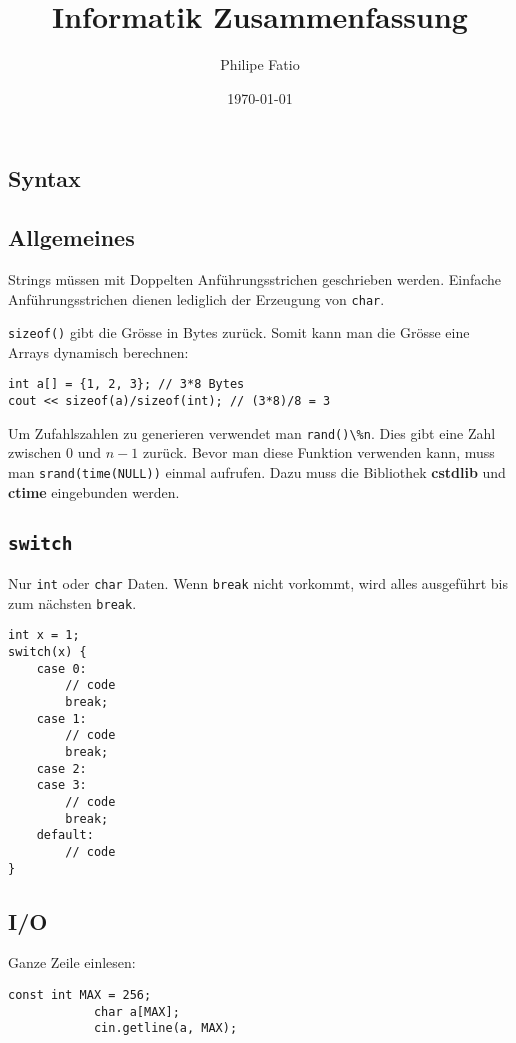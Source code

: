 \documentclass{article}
\author{Philipe Fatio}
\title{Informatik Zusammenfassung}
\date{\today}
\newenvironment{code}
	{\begin{shaded}\vspace{-2.2mm}} 
	{\vspace{-5.0mm}\end{shaded}}
\begin{document}
\begin{multicols*}{3}

	\section{Syntax} %
		\subsection{Allgemeines} %
			Strings müssen mit Doppelten Anführungsstrichen geschrieben werden. Einfache Anführungsstrichen dienen lediglich der Erzeugung von \lstinline!char!.
			
			\lstinline!sizeof()! gibt die Grösse in Bytes zurück. Somit kann man die Grösse eine Arrays dynamisch berechnen:
			\begin{code}
				\begin{lstlisting}[style=list]
int a[] = {1, 2, 3}; // 3*8 Bytes
cout << sizeof(a)/sizeof(int); // (3*8)/8 = 3
				\end{lstlisting}
			\end{code}
			
			Um Zufahlszahlen zu generieren verwendet man \lstinline!rand()\%n!. Dies gibt eine Zahl zwischen 0 und $n-1$ zurück. Bevor man diese Funktion verwenden kann, muss man \lstinline!srand(time(NULL))! einmal aufrufen. Dazu muss die Bibliothek \textbf{cstdlib} und \textbf{ctime} eingebunden werden.
		\subsection{\lstinline!switch!} %
			Nur \lstinline!int! oder \lstinline!char! Daten. Wenn \lstinline!break! nicht vorkommt, wird alles ausgeführt bis zum nächsten \lstinline!break!.
			
			\begin{code}
				\begin{lstlisting}[style=list]
int x = 1;
switch(x) {
	case 0:
		// code
		break;
	case 1:
		// code
		break;
	case 2:
	case 3:
		// code
		break;
	default:
		// code
}
				\end{lstlisting}
			\end{code}
					\subsection{I/O} %
						Ganze Zeile einlesen:
						\begin{code}
							\begin{lstlisting}[style=list]
			const int MAX = 256;
			char a[MAX];
			cin.getline(a, MAX);
							\end{lstlisting}
						\end{code}


\end{multicols*}
\end{document}
